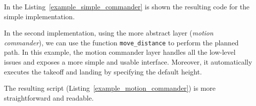 In the Listing~\ref{example_simple_commander} is shown the resulting code for the simple implementation.

In the second implementation, using the more abstract layer (\textit{motion commander}), we can use the function \verb|move_distance| to perform the planned path.
In this example, the motion commander layer handles all the low-level issues and exposes a more simple and usable interface. 
Moreover, it automatically executes the takeoff and landing by specifying the default height.

The resulting script (Listing~\ref{example_motion_commander}) is more straightforward and readable.

\begin{figure}[tb]
    \centering
    
\end{figure}
\begin{figure}[tb]
    \centering
    
\end{figure}
